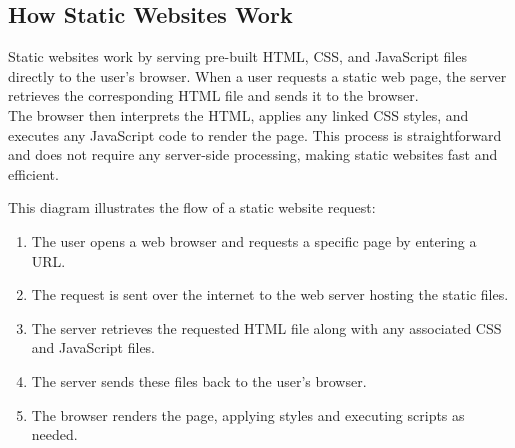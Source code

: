 \subsection{How Static Websites Work}
Static websites work by serving pre-built HTML, CSS, and JavaScript files directly to the user's browser. When a user requests a static web page, the server retrieves the corresponding HTML file and sends it to the browser.\\ The browser then interprets the HTML, applies any linked CSS styles, and executes any JavaScript code to render the page. This process is straightforward and does not require any server-side processing, making static websites fast and efficient.

\begin{center}
\end{center}

This diagram illustrates the flow of a static website request:
\begin{enumerate}
    \item The user opens a web browser and requests a specific page by entering a URL.\ 
    \item The request is sent over the internet to the web server hosting the static files.
    \item The server retrieves the requested HTML file along with any associated CSS and JavaScript files.
    \item The server sends these files back to the user's browser.
    \item The browser renders the page, applying styles and executing scripts as needed.
\end{enumerate}

